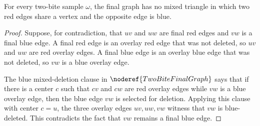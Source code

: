 \begin{helper}
For every two-bite sample \(\omega\), the final graph has no mixed triangle in
which two red edges share a vertex and the opposite edge is blue.
\end{helper}
\begin{proof}
Suppose, for contradiction, that \(uv\) and \(uw\) are final red edges and
\(vw\) is a final blue edge.  A final red edge is an overlay red edge that was
not deleted, so \(uv\) and \(uw\) are red overlay edges.  A final blue edge is
an overlay blue edge that was not deleted, so \(vw\) is a blue overlay edge.

The blue mixed-deletion clause in \(\noderef{TwoBiteFinalGraph}\) says that if
there is a center \(c\) such that \(cv\) and \(cw\) are red overlay edges while
\(vw\) is a blue overlay edge, then the blue edge \(vw\) is selected for
deletion.  Applying this clause with center \(c=u\), the three overlay edges
\(uv,uw,vw\) witness that \(vw\) is blue-deleted.  This contradicts the fact
that \(vw\) remains a final blue edge.
\end{proof}
